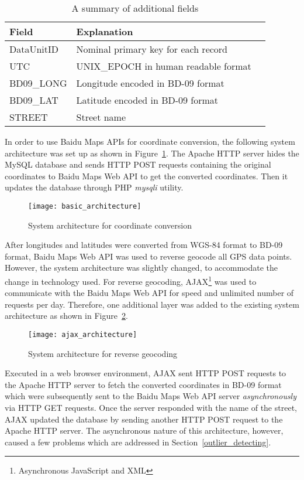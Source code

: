 \begin{table}[h!]
\centering
\begin{tabular}{ | l | l | l | }
\hline
\textbf{Field} & \textbf{Explanation} \\ \hline
DataUnitID & Nominal primary key for each record \\ \hline
UTC & UNIX\_EPOCH in human readable format \\ \hline
BD09\_LONG & Longitude encoded in BD-09 format\\ \hline
BD09\_LAT & Latitude encoded in BD-09 format\\ \hline
STREET & Street name\\ \hline
\end{tabular}
\caption{A summary of additional fields}\label{Ta:addtional_field}
\end{table}

In order to use Baidu Maps APIs for coordinate conversion, the following system architecture was set up as shown in Figure~\ref{Fig:basic_architecture}. The Apache HTTP server hides the MySQL database and sends HTTP POST requests containing the original coordinates to Baidu Maps Web API to get the converted coordinates. Then it updates the database through PHP \emph{mysqli} utility. 

\begin{figure}[h!]
\texttt{[image: basic\_architecture]}
\centering
\caption{System architecture for coordinate conversion}\label{Fig:basic_architecture}
\end{figure}

After longitudes and latitudes were converted from WGS-84 format to BD-09 format, Baidu Maps Web API was used to reverse geocode all GPS data points. However, the system architecture was slightly changed, to accommodate the change in technology used. For reverse geocoding, AJAX\footnote{Asynchronous JavaScript and XML} was used to communicate with the Baidu Maps Web API for speed and unlimited number of requests per day. Therefore, one additional layer was added to the existing system architecture as shown in Figure~\ref{Fig:ajax_architecture}. 

\begin{figure}[h]
\texttt{[image: ajax\_architecture]}
\centering
\caption{System architecture for reverse geocoding}\label{Fig:ajax_architecture}
\end{figure}

Executed in a web browser environment, AJAX sent HTTP POST requests to the Apache HTTP server to fetch the converted coordinates in BD-09 format which were subsequently sent to the Baidu Maps Web API server \emph{asynchronously} via HTTP GET requests. Once the server responded with the name of the street, AJAX updated the database by sending another HTTP POST request to the Apache HTTP server. The asynchronous nature of this architecture, however, caused a few problems which are addressed in Section~\ref{outlier_detecting}. 

